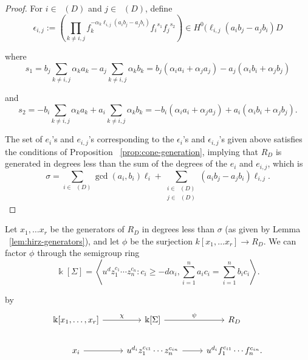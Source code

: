 \documentclass{amsart}
\theoremstyle{plain}
\theoremstyle{definition}
\theoremstyle{remark}
\numberwithin{equation}{section}
\newcommand\bk{{\Bbbk}}
\newcommand\bida{a}
\newcommand\bidb{b}
\DeclareMathOperator{\Te}{T_=}
\DeclareMathOperator{\Tp}{T_+}
\DeclareMathOperator{\Tm}{T_-}
\begin{document}
\begin{proof}
\noindent
For $i \in \Tp(D)$ and $j \in \Tm(D)$, define
\begin{equation}\label{eqn:epsilon_i,j}
	\epsilon_{i, j} := \left(\prod_{k \ne i, j} f_k^{-\alpha_k \ell_{i,j} (\bida_i \bidb_
	j - \bida_j \bidb_i)} {f_i}^{s_1} {f_j}^{s_2}\right) \in H^0(\ell_{i, j}
	(\bida_i \bidb_j - \bida_j \bidb_i) D
\end{equation}

\noindent
where
\[
	s_1 = \bidb_j \sum_{k \ne i,j} \alpha_k \bida_k - \bida_j \sum_{k \ne i, j}
	\alpha_k \bidb_k = b_j (\alpha_i a_i + \alpha_j a_j) - a_j (\alpha_i b_i + \alpha_j b_j)
\]

\noindent
and
\[
	s_2 = -\bidb_i \sum_{k \ne i, j} \alpha_k \bida_k + \bida_i \sum_{k \ne i, j}
	\alpha_k \bidb_k = -b_i (\alpha_i a_i + \alpha_j a_j) + a_i (\alpha_i b_i + \alpha_j b_j).
\]

The set of $e_i$'s and $e_{i,j}$'s corresponding to the $\epsilon_i$'s and $\epsilon_{i,j}$'s given above satisfies the conditions of
Proposition ~\ref{prop:cone-generation}, implying that $R_D$ is generated in 
degrees less than the sum of the degrees of the $e_i$ and $e_{i,j}$, which is
\[
	\sigma = \sum_{i\in \Te(D)} \gcd(\bida_i, \bidb_i)\ell_i + \sum_{\substack{
	i \in \Tp(D) \\	j \in \Tm(D)}} (\bida_i \bidb_j- \bida_j \bidb_i)\ell_{i,j}.
\]

\end{proof}

Let $x_1, \ldots x_r$ be the generators of $R_D$ in degrees less than $\sigma$
(as given by Lemma ~\ref{lem:hirz-generators}), and let $\phi$ be the
surjection $k[x_1, \ldots x_r] \to R_D$.  We can factor $\phi$ through the
semigroup ring 
\[
	\bk[\Sigma] = \left \langle u^d z_1^{c_1} \cdots z_n^{c_n} : c_i \geq -d
	\alpha_i, \sum_{i=1}^{n} \bida_i c_i = \sum_{i=1}^{n} \bidb_i c_i
	\right \rangle.
\]

\noindent
by
\[
\begin{tikzcd}
	\bk[x_1,\ldots, x_r] \ar {r}{\chi} & \bk[\Sigma] \ar {r}{\psi} & R_D \\
	x_i \ar r & u^{d_i}z_1^{c_{i1}} \cdots z_n^{c_{in}} \ar r & u^{d_i}f_1^{c_{i1}} \cdots f_n^{c_{in}}.
\end{tikzcd}
\]
\end{document}
